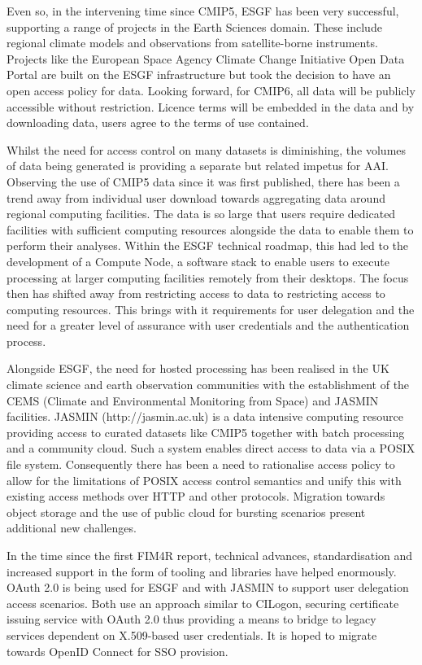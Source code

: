 \documentclass[fleqn,11pt]{wlscirep}
\begin{document}
{Even so, in the intervening time since CMIP5, ESGF has been very successful, supporting a range of projects in the Earth Sciences domain. These include regional climate models and observations from satellite-borne instruments. Projects like the European Space Agency Climate Change Initiative Open Data Portal are built on the ESGF infrastructure but took the decision to have an open access policy for data. Looking forward, for CMIP6, all data will be publicly accessible without restriction. Licence terms will be embedded in the data and by downloading data, users agree to the terms of use contained.

Whilst the need for access control on many datasets is diminishing, the volumes of data being generated is providing a separate but related impetus for AAI. Observing the use of CMIP5 data since it was first published, there has been a trend away from individual user download towards aggregating data around regional computing facilities. The data is so large that users require dedicated facilities with sufficient computing resources alongside the data to enable them to perform their analyses. Within the ESGF technical roadmap, this had led to the development of a Compute Node, a software stack to enable users to execute processing at larger computing facilities remotely from their desktops. The focus then has shifted away from restricting access to data to restricting access to computing resources. This brings with it requirements for user delegation and the need for a greater level of assurance with user credentials and the authentication process.

Alongside ESGF, the need for hosted processing has been realised in the UK climate science and earth observation communities with the establishment of the CEMS (Climate and Environmental Monitoring from Space) and JASMIN facilities. JASMIN (http://jasmin.ac.uk) is a data intensive computing resource providing access to curated datasets like CMIP5 together with batch processing and a community cloud. Such a system enables direct access to data via a POSIX file system. Consequently there has been a need to rationalise access policy to allow for the limitations of POSIX access control semantics and unify this with existing access methods over HTTP and other protocols. Migration towards object storage and the use of public cloud for bursting scenarios present additional new challenges.

In the time since the first FIM4R report, technical advances, standardisation and increased support in the form of tooling and libraries have helped enormously. OAuth 2.0 is being used for ESGF and with JASMIN to support user delegation access scenarios. Both use an approach similar to CILogon, securing certificate issuing service with OAuth 2.0 thus providing a means to bridge to legacy services dependent on X.509-based user credentials. It is hoped to migrate towards OpenID Connect for SSO provision.

}
\end{document}
